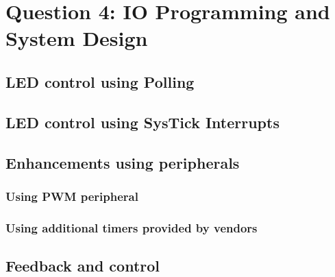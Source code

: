 \section*{Question 4: \small{IO Programming and System Design}}
\setcounter{section}{4}

\subsection{LED control using Polling}



\clearpage
\subsection{LED control using SysTick Interrupts}



\clearpage
\subsection{Enhancements using peripherals}

\subsubsection{Using PWM peripheral}



\clearpage
\subsubsection{Using additional timers provided by vendors}



\clearpage
\subsection{Feedback and control}
